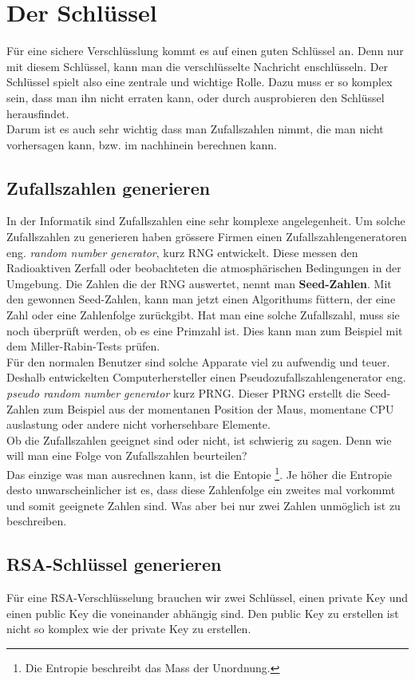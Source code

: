 \newpage
\section{Der Schlüssel}
Für eine sichere Verschlüsslung kommt es auf einen guten Schlüssel an. Denn nur mit diesem Schlüssel, kann man die verschlüsselte Nachricht enschlüsseln. Der Schlüssel spielt also eine zentrale und wichtige Rolle. Dazu muss er so komplex sein, dass man ihn nicht erraten kann, oder durch ausprobieren den Schlüssel herausfindet.\\
Darum ist es auch sehr wichtig dass man Zufallszahlen nimmt, die man nicht vorhersagen kann, bzw. im nachhinein berechnen kann.
\subsection{Zufallszahlen generieren}
In der Informatik sind Zufallszahlen eine sehr komplexe angelegenheit. Um solche Zufallszahlen zu generieren haben grössere Firmen einen Zufallszahlengeneratoren eng. \textit{random number generator}, kurz RNG entwickelt. Diese messen den Radioaktiven Zerfall oder beobachteten die atmosphärischen Bedingungen in der Umgebung. Die Zahlen die der RNG auswertet, nennt man \textbf{Seed-Zahlen}. Mit den gewonnen Seed-Zahlen, kann man jetzt einen Algorithums füttern, der eine Zahl oder eine Zahlenfolge zurückgibt. Hat man eine solche Zufallszahl, muss sie noch überprüft werden, ob es eine Primzahl ist. Dies kann man zum Beispiel mit dem Miller-Rabin-Tests prüfen.\\
%
Für den normalen Benutzer sind solche Apparate viel zu aufwendig und teuer. Deshalb entwickelten Computerhersteller einen Pseudozufallszahlengenerator eng. \textit{pseudo random number generator} kurz PRNG. Dieser PRNG erstellt die Seed-Zahlen zum Beispiel aus der momentanen Position der Maus, momentane CPU auslastung oder andere nicht vorhersehbare Elemente.\\
Ob die Zufallszahlen geeignet sind oder nicht, ist schwierig zu sagen. Denn wie will man eine Folge von Zufallszahlen beurteilen?\\
Das einzige was man ausrechnen kann, ist die Entopie \footnote{Die Entropie beschreibt das Mass der Unordnung.}. Je höher die Entropie desto unwarscheinlicher ist es, dass diese Zahlenfolge ein zweites mal vorkommt und somit geeignete Zahlen sind. Was aber bei nur zwei Zahlen unmöglich ist zu beschreiben.
\subsection{RSA-Schlüssel generieren}
Für eine RSA-Verschlüsselung brauchen wir zwei Schlüssel, einen private Key und einen public Key die voneinander abhängig sind. Den public Key zu erstellen ist nicht so komplex wie der private Key zu erstellen.
